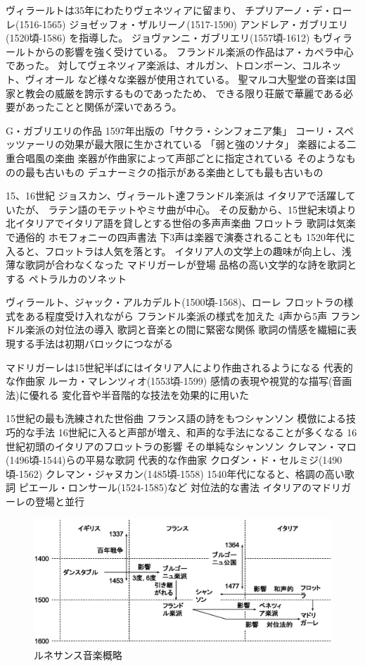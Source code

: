 \documentclass[a4j]{jarticle}
\begin{document}
ヴィラールトは35年にわたりヴェネツィアに留まり、
チプリアーノ・デ・ローレ(1516-1565)
ジョゼッフォ・ザルリーノ(1517-1590)
アンドレア・ガブリエリ(1520頃-1586)
を指導した。
ジョヴァンニ・ガブリエリ(1557頃-1612)
もヴィラールトからの影響を強く受けている。
フランドル楽派の作品はア・カペラ中心であった。
対してヴェネツィア楽派は、オルガン、トロンボーン、コルネット、ヴィオール
など様々な楽器が使用されている。
聖マルコ大聖堂の音楽は国家と教会の威厳を誇示するものであったため、
できる限り荘厳で華麗である必要があったことと関係が深いであろう。

G・ガブリエリの作品
1597年出版の「サクラ・シンフォニア集」
コーリ・スペッツァーリの効果が最大限に生かされている
「弱と強のソナタ」
楽器による二重合唱風の楽曲
楽器が作曲家によって声部ごとに指定されている
そのようなものの最も古いもの
デュナーミクの指示がある楽曲としても最も古いもの

15、16世紀
ジョスカン、ヴィラールト達フランドル楽派は
イタリアで活躍していたが、
ラテン語のモテットやミサ曲が中心。
その反動から、15世紀末頃より
北イタリアでイタリア語を貸しとする世俗の多声声楽曲
フロットラ
歌詞は気楽で通俗的
ホモフォニーの四声書法
下3声は楽器で演奏されることも
1520年代に入ると、フロットラは人気を落とす。
イタリア人の文学上の趣味が向上し、浅薄な歌詞が合わなくなった
マドリガーレが登場
品格の高い文学的な詩を歌詞とする
ペトラルカのソネット

ヴィラールト、ジャック・アルカデルト(1500頃-1568)、ローレ
フロットラの様式をある程度受け入れながら
フランドル楽派の様式を加えた
4声から5声
フランドル楽派の対位法の導入
歌詞と音楽との間に緊密な関係
歌詞の情感を繊細に表現する手法は初期バロックにつながる

マドリガーレは15世紀半ばにはイタリア人により作曲されるようになる
代表的な作曲家
ルーカ・マレンツィオ(1553頃-1599)
感情の表現や視覚的な描写(音画法)に優れる
変化音や半音階的な技法を効果的に用いた

15世紀の最も洗練された世俗曲
フランス語の詩をもつシャンソン
模倣による技巧的な手法
16世紀に入ると声部が増え、和声的な手法になることが多くなる
16世紀初頭のイタリアのフロットラの影響
その単純なシャンソン
クレマン・マロ(1496頃-1544)らの平易な歌詞
代表的な作曲家
クロダン・ド・セルミジ(1490頃-1562)
クレマン・ジャヌカン(1485頃-1558)
1540年代になると、格調の高い歌詞
ピエール・ロンサール(1524-1585)など
対位法的な書法
イタリアのマドリガーレの登場と並行

\begin{figure}[tb]
 \begin{center}
  \includegraphics[width=\hsize]{fig/renaissance_summary.eps}
  \caption{ルネサンス音楽概略}
  \label{fig:renaissance_summary}
 \end{center}
\end{figure}
\end{document}
